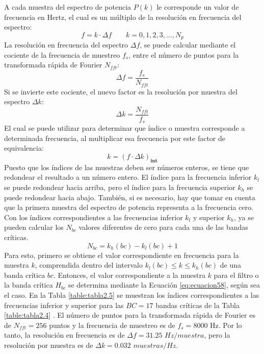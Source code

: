 \begin{enumerate}
\begin{enumerate}
\vskip 0.5cm
A cada muestra del espectro de potencia $P(k)$ le corresponde un valor de frecuencia en Hertz, el cual es un múltiplo de la resolución en frecuencia del espectro:
\begin{equation}
\label{eq:ecuacion58}
f = k \cdot \Delta f
\qquad
k = 0,1,2,3,...,N_{p}
\end{equation}
La resolución en frecuencia del espectro $\Delta f$, se puede calcular mediante el cociente de la frecuencia de muestreo $f_{s}$, entre el número de puntos para la transformada rápida de Fourier $N_{fft}$:
\begin{equation}
\label{eq:ecuacion59}
\Delta f = \frac{f_{s}}{N_{fft}}
\end{equation}
Si se invierte este cociente, el nuevo factor es la resolución por muestra del espectro $\Delta k$:
\begin{equation}
\label{eq:ecuacion60}
\Delta k = \frac{N_{fft}}{f_{s}}
\end{equation}
El cual se puede utilizar para determinar que índice o muestra corresponde a determinada frecuencia, al multiplicar esa frecuencia por este factor de equivalencia:
\begin{equation}
\label{eq:ecuacion61}
k = \left ( f \cdot \Delta k  \right )_{\mathbf{int}}
\end{equation}
Puesto que los índices de las muestras deben ser números enteros, se tiene que redondear el resultado a un número entero. El índice para la frecuencia inferior $k_{l}$ se puede redondear hacia arriba, pero el índice para la frecuencia superior $k_{h}$ se puede redondear hacia abajo. También, si es necesario, hay que tomar en cuenta que la primera muestra del espectro de potencia representa a la frecuencia cero.
\vskip 0.5cm
Con los índices correspondientes a las frecuencias inferior $k_{l}$ y superior $k_{h}$, ya se pueden calcular los $N_{bc}$ valores diferentes de cero para cada una de las bandas críticas.
\begin{equation}
\label{eq:ecuacion62}
N_{bc} = k_{h}(bc) - k_{l}(bc) + 1
\end{equation}
Para esto, primero se obtiene el valor correspondiente en frecuencia para la muestra $k$, comprendida dentro del intervalo $k_{l}(bc) \leq k \leq k_{h}(bc)$ de una banda crítica $bc$. Entonces, el valor correspondiente a la muestra $k$ para el filtro o la banda crítica $H_{bc}$ se determina mediante la Ecuación \eqref{eq:ecuacion58}, según sea el caso.
\vskip 0.5cm
En la Tabla \ref{table:tabla2.5} se muestran los índices correspondientes a las frecuencias inferior y superior para las $BC =17$ bandas críticas de la Tabla \ref{table:tabla2.4} . El número de puntos para la transformada rápida de Fourier es de $N_{fft} = 256$ puntos y la frecuencia de muestreo es de $f_{s} = 8000$ Hz. Por lo tanto, la resolución en frecuencia es de $\Delta f = 31.25$ $Hz/muestra$, pero la resolución por muestra es de $\Delta k =0.032$ $muestras/Hz$.


\end{enumerate}
\end{enumerate}
